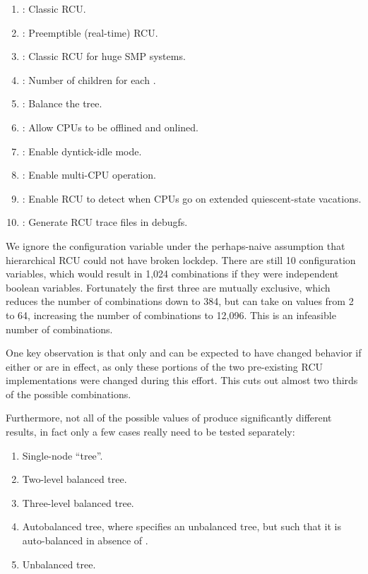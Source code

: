 \begin{enumerate}
\item    {}: Classic RCU.
\item    {}: Preemptible (real-time) RCU.
\item    {}: Classic RCU for huge SMP systems.
\item    {}: Number of children for each
		.
\item    {}: Balance the
		 tree.
\item    {}: Allow CPUs to be offlined
		and onlined.
\item    {}: Enable dyntick-idle mode.
\item    {}: Enable multi-CPU operation.
\item    {}: Enable RCU to detect
		when CPUs go on extended quiescent-state vacations.
\item    {}: Generate RCU trace files in debugfs.
\end{enumerate}

We ignore the  configuration
variable under the perhaps-naive assumption that hierarchical RCU
could not have broken lockdep.
There are still 10 configuration variables, which would result in
1,024 combinations if they were independent boolean variables.
Fortunately the first three are mutually exclusive, which reduces
the number of combinations down to 384, but 
can take on values from 2 to 64, increasing the number of combinations
to 12,096.
This is an infeasible number of combinations.

One key observation is that only 
and  can be expected to have changed behavior
if either  or
 are in effect, as only these portions
of the two pre-existing RCU implementations were changed during this effort.
This cuts out almost two thirds of the possible combinations.

Furthermore, not all of the possible values of
 produce significantly different results,
in fact only a few cases really need to be tested separately:

\begin{enumerate}
\item	Single-node ``tree''.
\item	Two-level balanced tree.
\item	Three-level balanced tree.
\item	Autobalanced tree, where 
	specifies an unbalanced tree, but such that it is auto-balanced
	in absence of .
\item	Unbalanced tree.
\end{enumerate}

